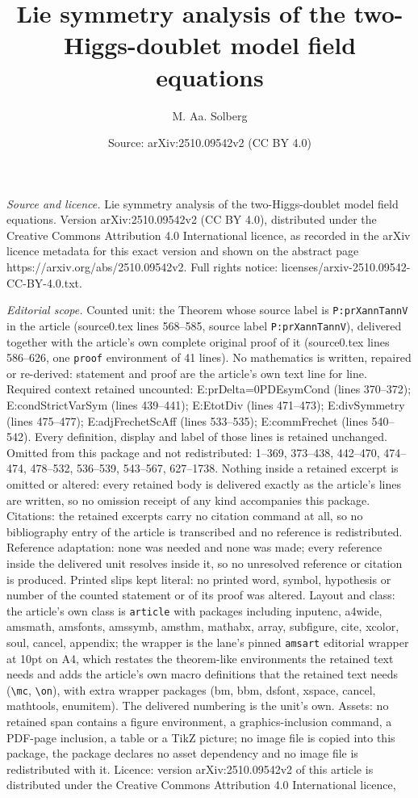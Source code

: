 \documentclass[10pt,a4paper]{amsart}
\title[Lie symmetry analysis of the two-Higgs-doublet model field e]{Lie symmetry analysis of the two-Higgs-doublet model field equations}
\author{M. Aa. Solberg}
\date{Source: arXiv:2510.09542v2 (CC BY 4.0)}
\begin{document}
\maketitle

\noindent\emph{Source and licence.} Lie symmetry analysis of the two-Higgs-doublet model field equations. Version arXiv:2510.09542v2 (CC BY 4.0), distributed under the Creative Commons Attribution 4.0 International licence, as recorded in the arXiv licence metadata for this exact version and shown on the abstract page https://arxiv.org/abs/2510.09542v2. Full rights notice: licenses/arxiv-2510.09542-CC-BY-4.0.txt.\par\smallskip

\noindent\textit{Editorial scope.} Counted unit: the Theorem whose source label is \texttt{P:prXannTannV} in the article (source0.tex lines 568--585, source label \texttt{P:prXannTannV}), delivered together with the article's own complete original proof of it (source0.tex lines 586--626, one \texttt{proof} environment of 41 lines). No mathematics is written, repaired or re-derived: statement and proof are the article's own text line for line. Required context retained uncounted: E:prDelta=0PDEsymCond (lines 370--372); E:condStrictVarSym (lines 439--441); E:EtotDiv (lines 471--473); E:divSymmetry (lines 475--477); E:adjFrechetScAff (lines 533--535); E:commFrechet (lines 540--542). Every definition, display and label of those lines is retained unchanged. Omitted from this package and not redistributed: 1--369, 373--438, 442--470, 474--474, 478--532, 536--539, 543--567, 627--1738. Nothing inside a retained excerpt is omitted or altered: every retained body is delivered exactly as the article's lines are written, so no omission receipt of any kind accompanies this package. Citations: the retained excerpts carry no citation command at all, so no bibliography entry of the article is transcribed and no reference is redistributed. Reference adaptation: none was needed and none was made; every reference inside the delivered unit resolves inside it, so no unresolved reference or citation is produced. Printed slips kept literal: no printed word, symbol, hypothesis or number of the counted statement or of its proof was altered. Layout and class: the article's own class is \texttt{article} with packages including inputenc, a4wide, amsmath, amsfonts, amssymb, amsthm, mathabx, array, subfigure, cite, xcolor, soul, cancel, appendix; the wrapper is the lane's pinned \texttt{amsart} editorial wrapper at 10pt on A4, which restates the theorem-like environments the retained text needs and adds the article's own macro definitions that the retained text needs (\texttt{\textbackslash mc}, \texttt{\textbackslash on}), with extra wrapper packages (bm, bbm, dsfont, xspace, cancel, mathtools, enumitem). The delivered numbering is the unit's own. Assets: no retained span contains a figure environment, a graphics-inclusion command, a PDF-page inclusion, a table or a TikZ picture; no image file is copied into this package, the package declares no asset dependency and no image file is redistributed with it. Licence: version arXiv:2510.09542v2 of this article is distributed under the Creative Commons Attribution 4.0 International licence, 
\end{document}
